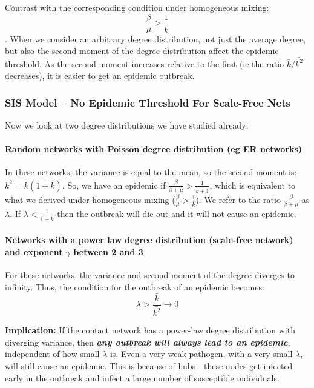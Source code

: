 \documentclass[11pt]{scrartcl} %
\begin{document}
Contrast with the corresponding condition under homogeneous mixing: 
\[ \frac{\beta}{\mu} > \frac{1}{\bar{k}} \].
When we consider an arbitrary degree distribution, not just the average degree, but also the second moment of the degree distribution affect the epidemic threshold. As the second moment increases relative to the first (ie the ratio $\bar{k}/\bar{k^2}$ decreases), it is easier to get an epidemic outbreak.



\subsubsection{SIS Model – No Epidemic Threshold For Scale-Free Nets}
Now we look at two degree distributions we have studied already:
\paragraph{Random networks with Poisson degree distribution (eg ER networks)} In these networks, the variance is equal to the mean, so the second moment is: $\bar{k^2} = \bar{k}(1+\bar{k})$. So, we have an epidemic if $\frac{\beta}{\beta+\mu} > \frac{1}{\bar{k}+1}$, which is equivalent to what we derived under homogeneous mixing ($\frac{\beta}{\mu} > \frac{1}{\bar{k}}$). We refer to the ratio $\frac{\beta}{\beta+\mu}$ as $\lambda$. If $\lambda < \frac{1}{1+\bar{k}}$ then the outbreak will die out and it will not cause an epidemic.

\paragraph{Networks with a power law degree distribution (scale-free network) and exponent $\gamma$ between 2 and 3} For these networks, the variance and second moment of the degree diverges to infinity. Thus, the condition for the outbreak of an epidemic becomes: 
\[ \lambda > \frac{\bar{k}}{\bar{k^2}} \rightarrow 0 \] 

\textbf{Implication:} If the contact network has a power-law degree distribution with diverging variance, then \emph{\textbf{any outbreak will always lead to an epidemic}}, independent of how small $\lambda$ is. Even a very weak pathogen, with a very small $\lambda$, will still cause an epidemic. This is because of hubs - these nodes get infected early in the outbreak and infect a large number of susceptible individuals.
\end{document}
